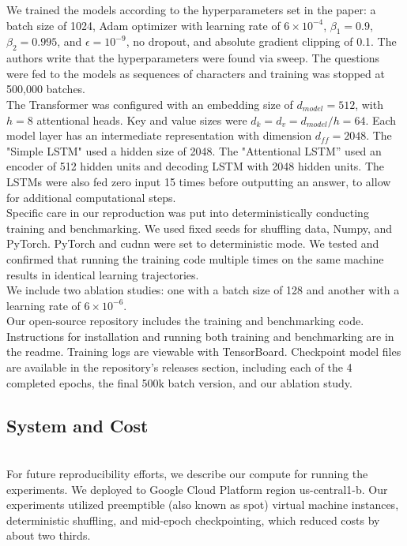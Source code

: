 We trained the models according to the hyperparameters set in the paper: a batch size of 1024, Adam optimizer with learning rate of $6 \times 10^{-4}$,  $\beta_{1} = 0.9$, $\beta_{2} = 0.995$, and $\epsilon = 10^{-9}$, no dropout, and absolute gradient clipping of 0.1. The authors write that the hyperparameters were found via sweep. The questions were fed to the models as sequences of characters and training was stopped at 500,000 batches.\\

The Transformer was configured with an embedding size of $d_{model} = 512$, with $h = 8$ attentional heads. Key and value sizes were $d_{k} = d_{v} = d_{model}/h = 64$. Each model layer has an intermediate representation with dimension $d_{ff} = 2048$. The "Simple LSTM" used a hidden size of 2048. The "Attentional LSTM” used an encoder of 512 hidden units and decoding LSTM with 2048 hidden units. The LSTMs were also fed zero input 15 times before outputting an answer, to allow for additional computational steps. \\

Specific care in our reproduction was put into deterministically conducting training and benchmarking. We used fixed seeds for shuffling data, Numpy, and PyTorch. PyTorch and cudnn were set to deterministic mode. We tested and confirmed that running the training code multiple times on the same machine results in identical learning trajectories. \\

We include two ablation studies: one with a batch size of 128 and another with a learning rate of $6 \times 10^{-6}$. \\

Our open-source repository\supercite{hs-math-nlp} includes the training and benchmarking code. Instructions for installation and running both training and benchmarking are in the readme. Training logs are viewable with TensorBoard\supercite{tensorboard}. Checkpoint model files are available in the repository's releases section, including each of the 4 completed epochs, the final 500k batch version, and our ablation study. \\

\subsection{System and Cost} \\

For future reproducibility efforts, we describe our compute for running the experiments. We deployed to Google Cloud Platform region us-central1-b. Our experiments utilized preemptible (also known as spot) virtual machine instances, deterministic shuffling, and mid-epoch checkpointing, which reduced costs by about two thirds. \\

